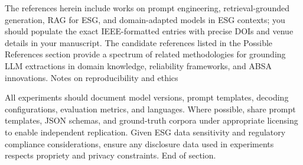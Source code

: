 The references herein include works on prompt engineering, retrieval-grounded generation, RAG for ESG, and domain-adapted models in ESG contexts; you should populate the exact IEEE-formatted entries with precise DOIs and venue details in your manuscript. The candidate references listed in the Possible References section provide a spectrum of related methodologies for grounding LLM extractions in domain knowledge, reliability frameworks, and ABSA innovations.
Notes on reproducibility and ethics

All experiments should document model versions, prompt templates, decoding configurations, evaluation metrics, and languages. Where possible, share prompt templates, JSON schemas, and ground-truth corpora under appropriate licensing to enable independent replication. Given ESG data sensitivity and regulatory compliance considerations, ensure any disclosure data used in experiments respects propriety and privacy constraints.
End of section.